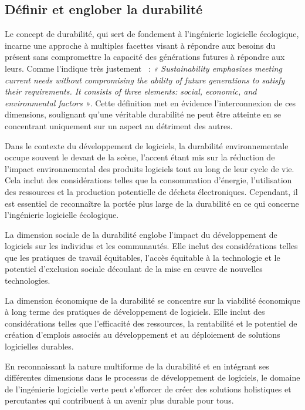 \subsection{Définir et englober la durabilité}
Le concept de durabilité, qui sert de fondement à l'ingénierie logicielle écologique, incarne une approche à multiples facettes visant à répondre aux besoins du présent sans compromettre la capacité des générations futures à répondre aux leurs. Comme l'indique très justement~\cite{IntegrationSustainabilityMetrics} : \emph{« Sustainability emphasizes meeting current needs without compromising the ability of future generations to satisfy their requirements. It consists of three elements: social, economic, and environmental factors »}. Cette définition met en évidence l'interconnexion de ces dimensions, soulignant qu'une véritable durabilité ne peut être atteinte en se concentrant uniquement sur un aspect au détriment des autres.


Dans le contexte du développement de logiciels, la durabilité environnementale occupe souvent le devant de la scène, l'accent étant mis sur la réduction de l'impact environnemental des produits logiciels tout au long de leur cycle de vie. Cela inclut des considérations telles que la consommation d'énergie, l'utilisation des ressources et la production potentielle de déchets électroniques. Cependant, il est essentiel de reconnaître la portée plus large de la durabilité en ce qui concerne l'ingénierie logicielle écologique.


La dimension sociale de la durabilité englobe l'impact du développement de logiciels sur les individus et les communautés. Elle inclut des considérations telles que les pratiques de travail équitables, l'accès équitable à la technologie et le potentiel d'exclusion sociale découlant de la mise en œuvre de nouvelles technologies.


La dimension économique de la durabilité se concentre sur la viabilité économique à long terme des pratiques de développement de logiciels. Elle inclut des considérations telles que l'efficacité des ressources, la rentabilité et le potentiel de création d'emplois associés au développement et au déploiement de solutions logicielles durables.


En reconnaissant la nature multiforme de la durabilité et en intégrant ses différentes dimensions dans le processus de développement de logiciels, le domaine de l'ingénierie logicielle verte peut s'efforcer de créer des solutions holistiques et percutantes qui contribuent à un avenir plus durable pour tous.

